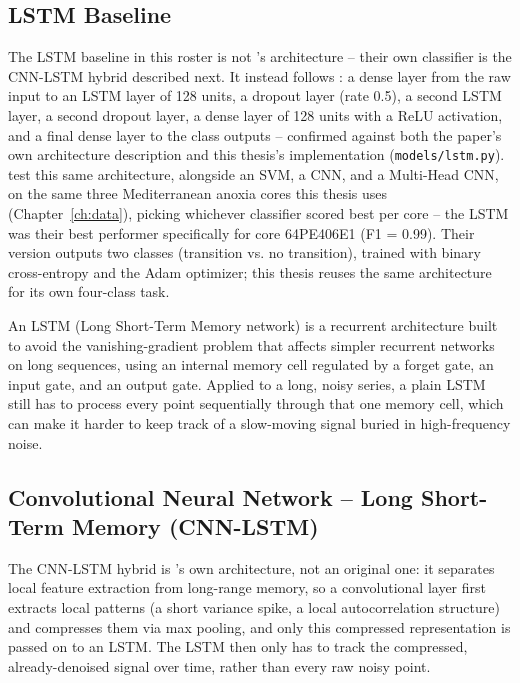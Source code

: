 \subsection{LSTM Baseline}

The LSTM baseline in this roster is not \citet{bury2021}'s architecture -- their own classifier is the CNN-LSTM hybrid described next. It instead follows \citet{ma2025sdml}: a dense layer from the raw input to an LSTM layer of 128 units, a dropout layer (rate 0.5), a second LSTM layer, a second dropout layer, a dense layer of 128 units with a ReLU activation, and a final dense layer to the class outputs -- confirmed against both the paper's own architecture description and this thesis's implementation (\texttt{models/lstm.py}). \citet{ma2025sdml} test this same architecture, alongside an SVM, a CNN, and a Multi-Head CNN, on the same three Mediterranean anoxia cores this thesis uses (Chapter~\ref{ch:data}), picking whichever classifier scored best per core -- the LSTM was their best performer specifically for core 64PE406E1 (F1 = 0.99). Their version outputs two classes (transition vs. no transition), trained with binary cross-entropy and the Adam optimizer; this thesis reuses the same architecture for its own four-class task.

An LSTM (Long Short-Term Memory network) is a recurrent architecture built to avoid the vanishing-gradient problem that affects simpler recurrent networks on long sequences, using an internal memory cell regulated by a forget gate, an input gate, and an output gate. Applied to a long, noisy series, a plain LSTM still has to process every point sequentially through that one memory cell, which can make it harder to keep track of a slow-moving signal buried in high-frequency noise.

\subsection{Convolutional Neural Network -- Long Short-Term Memory (CNN-LSTM)}

The CNN-LSTM hybrid is \citet{bury2021}'s own architecture, not an original one: it separates local feature extraction from long-range memory, so a convolutional layer first extracts local patterns (a short variance spike, a local autocorrelation structure) and compresses them via max pooling, and only this compressed representation is passed on to an LSTM. The LSTM then only has to track the compressed, already-denoised signal over time, rather than every raw noisy point.

